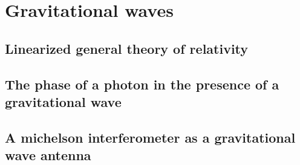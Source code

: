 \chapter{Gravitational waves}


\section{Linearized general theory of relativity}

% 

\section{The phase of a photon in the presence of a gravitational wave}

\section{A michelson interferometer as a gravitational wave antenna}
